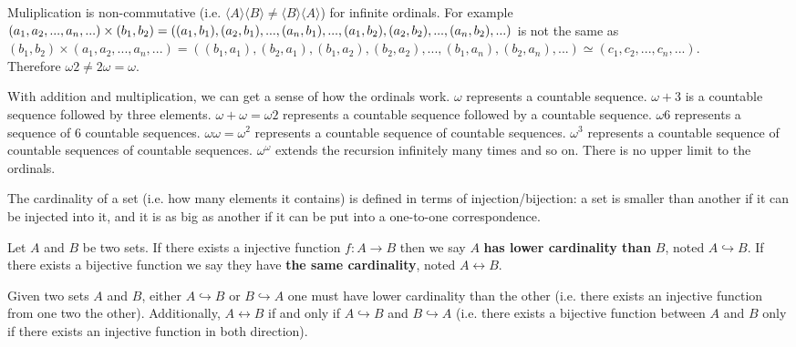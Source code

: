 \documentclass{article}
\newcommand{\marginleft}[1] {\reversemarginpar\marginpar{#1}}
\def\crdleq{\hookrightarrow}
\def\crdeq{\leftrightarrow}
\begin{document}
\begin{remark}
	Muliplication is non-commutative (i.e. $\langle A \rangle \langle B \rangle \neq \langle B \rangle \langle A \rangle$) for infinite ordinals. For example $(a_1, a_2, ..., a_n, ...) \times (b_1, b_2) = ((a_1, b_1), (a_2, b_1), ..., (a_n, b_1), ..., \\ (a_1, b_2), (a_2, b_2), ..., (a_n, b_2), ...)$ is not the same as $(b_1, b_2) \times (a_1, a_2, ..., a_n, ...) = ((b_1, a_1), (b_2, a_1), (b_1, a_2), (b_2, a_2), ..., (b_1, a_n), (b_2, a_n), ...) \simeq (c_1, c_2, ..., c_n, ...)$. \\ Therefore $\omega 2 \neq 2 \omega = \omega$.
	
	With addition and multiplication, we can get a sense of how the ordinals work. $\omega$ represents a countable sequence. $\omega +3$ is a countable sequence followed by three elements. $\omega + \omega  = \omega2$ represents a countable sequence followed by a countable sequence. $\omega6$ represents a sequence of 6 countable sequences. $\omega\omega = \omega^2$ represents a countable sequence of countable sequences. $\omega^3$ represents a countable sequence of countable sequences of countable sequences. $\omega^\omega$ extends the recursion infinitely many times and so on. There is no upper limit to the ordinals.
\end{remark}

\begin{remark}
	The cardinality of a set (i.e. how many elements it contains) is defined in terms of injection/bijection: a set is smaller than another if it can be injected into it, and it is as big as another if it can be put into a one-to-one correspondence.
\end{remark}

\begin{defn}
	Let $A$ \marginleft{Cardinality} and $B$ be two sets. If there exists a injective function $f : A \to B$ then we say $A$ \textbf{has lower cardinality than} $B$, noted $A \crdleq B$. If there exists a bijective function we say they have \textbf{the same cardinality}, noted $A \crdeq B$.
\end{defn}

\begin{prop}
	Given two sets $A$ and $B$, either $A \crdleq B$ or $B \crdleq A$ one must have lower cardinality than the other (i.e. there exists an injective function from one two the other). Additionally, $A \crdeq B$ if and only if $A \crdleq B$ and $B \crdleq A$ (i.e. there exists a bijective function between $A$ and $B$ only if there exists an injective function in both direction).
\end{prop}
\end{document}
